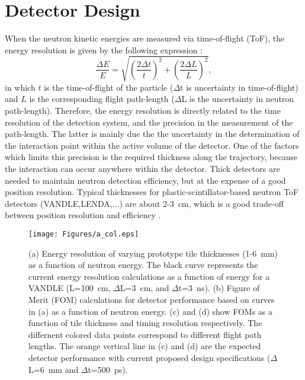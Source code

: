 \documentclass[preprint,3p,twocolumn]{elsarticle}
\begin{document}
\section{Detector Design}

When the neutron kinetic energies are measured via time-of-flight (ToF), the energy resolution is given by the following expression \cite{KORNILOV2009226}:
\begin{equation}
\frac{\Delta E}{E}=\sqrt{\left(\frac{2\Delta t}{t}\right )^2+\left(\frac{2\Delta L}{L}\right )^2},
\label{eq:resolution}
\end{equation}
in which $t$  is the time-of-flight of the particle ($\Delta$t is uncertainty in time-of-flight) and $L$ is the corresponding flight path-length ($\Delta$L is the uncertainty in neutron path-length). Therefore, the energy resolution is directly related to the time resolution of the detection system, and the precision in the measurement of the path-length. The latter is mainly due the the uncertainty in the determination of the interaction point within the active volume of the detector. One of the factors which limits this precision is the required thickness along the trajectory, because the interaction can occur anywhere within the detector. Thick detectors are needed to maintain neutron detection efficiency, but at the expense of a good position resolution. Typical thicknesses for plastic-scintillator-based neutron ToF detectors (VANDLE,LENDA,$\ldots$) are about 2-3~cm, which is a good trade-off between position resolution and efficiency \cite{PETERS2016122,BUTA2000412,MORRISSEY1997222,PERDIKAKIS2012117}.
\begin{figure}[tp]
\centering
\texttt{[image: Figures/a\_col.eps]}
\caption{(a) Energy resolution of varying prototype tile thicknesses (1-6~mm) as a function of neutron energy. The black curve represents the current energy resolution calculations as a function of energy for a VANDLE (L=100~cm, $\Delta$L=3~cm, and $\Delta$t=3~ns). (b) Figure of Merit (FOM) calculations for detector performance based on curves in (a) as a function of neutron energy. (c) and (d) show FOMs as a function of tile thickness and timing resolution respectively. The differnent colored data points correspond to different flight path lengths. The orange vertical line in (c) and (d) are the expected detector performance with current proposed design specifications ($\Delta$L=6~mm and $\Delta$t=500~ps).}
\label{fig:resolution}
\end{figure}
\end{document}
